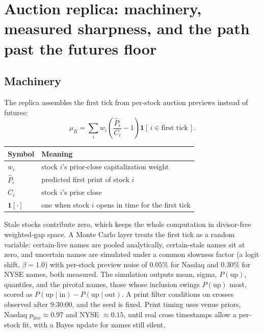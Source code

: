 \section{Auction replica: machinery, measured sharpness, and the path past
the futures floor}
\label{app:replica}

\subsection{Machinery}
\label{app:replica_machinery}

The replica assembles the first tick from per-stock auction previews
instead of futures:
\begin{equation}
\mu_R = \sum_i w_i \left( \frac{\hat P_i}{C_i} - 1 \right)
\mathbf{1}[\,i \in \mbox{first tick}\,].
\label{eq:replica}
\end{equation}

\begin{center}
\small
\begin{tabular}{ll}
\toprule
Symbol & Meaning \\
\midrule
$w_i$ & stock $i$'s prior-close capitalization weight \\
$\hat P_i$ & predicted first print of stock $i$ \\
$C_i$ & stock $i$'s prior close \\
$\mathbf{1}[\cdot]$ & one when stock $i$ opens in time for the first tick \\
\bottomrule
\end{tabular}
\end{center}

Stale stocks contribute zero, which keeps the whole computation in
divisor-free weighted-gap space. A Monte Carlo layer treats the first tick
as a random variable: certain-live names are pooled analytically,
certain-stale names sit at zero, and uncertain names are simulated under a
common slowness factor (a logit shift, $\beta = 1.0$) with per-stock
preview noise of $0.05\%$ for Nasdaq and $0.30\%$ for NYSE names, both
measured. The simulation outputs mean, sigma, $P(\mathrm{up})$, quantiles,
and the pivotal names, those whose inclusion swings $P(\mathrm{up})$
most, scored as $P(\mathrm{up} \mid \mathrm{in}) - P(\mathrm{up} \mid
\mathrm{out})$. A print filter conditions on crosses observed after
9:30:00, and the seed is fixed. Print timing uses venue priors, Nasdaq
$p_{\mathrm{live}} \approx 0.97$ and NYSE $\approx 0.15$, until real cross
timestamps allow a per-stock fit, with a Bayes update for names still
silent.


